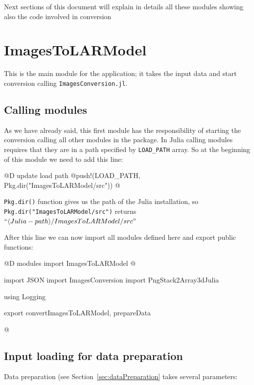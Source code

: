 \documentclass[11pt,oneside]{article}	%
\begin{document}
Next sections of this document will explain in details all these modules showing also the code involved in conversion

\section{ImagesToLARModel}\label{sec:ImagesToLARModel}

This is the main module for the application; it takes the input data and start conversion calling \texttt{ImagesConversion.jl}.

\subsection{Calling modules}\label{sec:modules}

As we have already said, this first module has the responsibility of starting the conversion calling all other modules in the package. In Julia calling modules requires that they are in a path specified by \texttt{LOAD\_PATH} array.
So at the beginning of this module we need to add this line:

@D update load path
@{push!(LOAD_PATH, Pkg.dir("ImagesToLARModel/src"))
@}

\texttt{Pkg.dir()} function gives us the path of the Julia installation, so \texttt{Pkg.dir("ImagesToLARModel/src")} returns $``\langle Julia-path\rangle /ImagesToLARModel/src"$

After this line we can now import all modules defined here and export public functions:

@D modules import ImagesToLARModel
@{import JSON
import ImagesConversion
import PngStack2Array3dJulia

using Logging

export convertImagesToLARModel, prepareData

@}

\subsection{Input loading for data preparation}\label{sec:inputDataPreparation}

Data preparation (see Section~\ref{sec:dataPreparation} takes several parameters:
\end{document}
